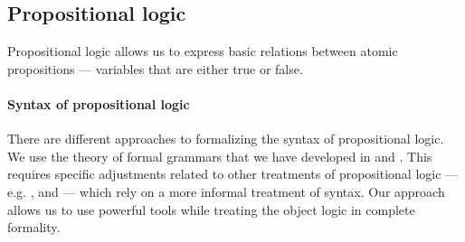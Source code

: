 \subsection{Propositional logic}\label{subsec:propositional_logic}

Propositional logic allows us to express basic relations between atomic propositions --- variables that are either true or false.

\paragraph{Syntax of propositional logic}\hfill

There are different approaches to formalizing the syntax of propositional logic. We use the theory of formal grammars that we have developed in  and . This requires specific adjustments related to other treatments of propositional logic --- e.g. ,  and  --- which rely on a more informal treatment of syntax. Our approach allows us to use powerful tools while treating the object logic in complete formality.

